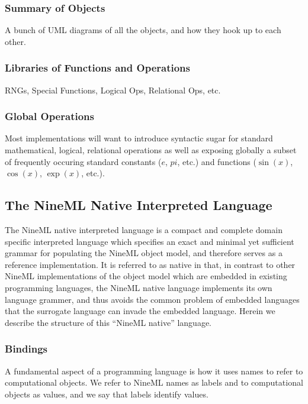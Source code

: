 \documentclass[a4paper]{article}
\begin{document}
\subsubsection{Summary of Objects}

A bunch of UML diagrams of all the objects, and how they hook up to each other.

\subsubsection{\label{nml_lib}Libraries of Functions and Operations}

RNGs, Special Functions, Logical Ops, Relational Ops, etc.

\subsubsection{Global Operations}

Most implementations will want to introduce syntactic sugar for
standard mathematical, logical, relational operations as well as
exposing globally a subset of frequently occuring standard constants
($e$, $pi$, etc.) and functions ($\sin(x)$, $\cos(x)$, $\exp(x)$,
etc.).


\subsection{The NineML Native Interpreted Language}

The NineML native interpreted language is a compact and complete
domain specific interpreted language which specifies an exact and
minimal yet sufficient grammar for populating the NineML object model,
and therefore serves as a reference implementation.  It is referred to
as native in that, in contrast to other NineML implementations of
the object model which are embedded in existing programming languages,
the NineML native language implements its own language grammer, and
thus avoids the common problem of embedded languages that the
surrogate language can invade the embedded language.  Herein we
describe the structure of this ``NineML native'' language.

\subsubsection{Bindings}

A fundamental aspect of a programming language is how it uses names to
refer to computational objects.  We refer to NineML names as labels
and to computational objects as values, and we say that labels
identify values.
\end{document}
